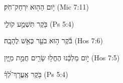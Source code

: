 
\begin{exe}

\ex\label{Ødaymorn_sim_exs1}
\texthebrew{
יֹ֥ום הַה֖וּא יִרְחַק־חֹֽק׃ 
} (Mic 7:11)

\ex\label{Ødaymorn_sim_exs2}
\texthebrew{
בֹּ֖קֶר תִּשְׁמַ֣ע קֹולִ֑י 
} (Ps 5:4)

\ex\label{Ødaymorn_sim_exs3}
\texthebrew{
בֹּ֕קֶר ה֥וּא בֹעֵ֖ר כְּאֵ֥שׁ לֶהָבָֽה׃ 
} (Hos 7:6)

\ex\label{Ødaymorn_sim_exs4}
\texthebrew{
יֹ֣ום מַלְכֵּ֔נוּ הֶחֱל֥וּ שָׂרִ֖ים חֲמַ֣ת מִיָּ֑יִן 
} (Hos 7:5)

\ex\label{Ødaymorn_sim_exs5}
\texthebrew{
בֹּ֥קֶר אֶֽעֱרָךְ־לְ֝ךָ֗ 
} (Ps 5:4)

\end{exe}

